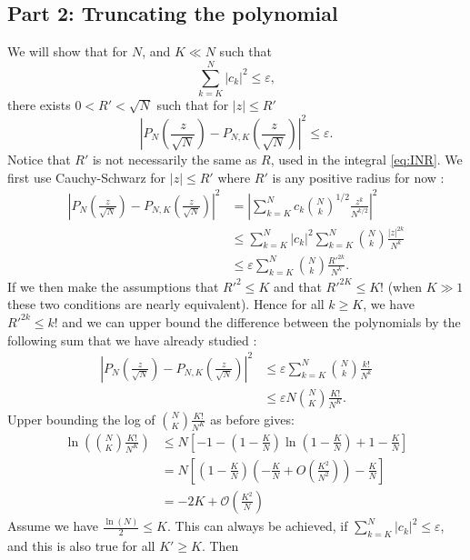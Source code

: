 \documentclass[aps,prl,showpacs,twocolumn]{revtex4-2}
\begin{document}
\subsection{Part 2: Truncating the polynomial}
We will show that for $N$, and $K \ll N$ such that
\[ \sum_{k=K}^N |c_k|^2 \leq \varepsilon, \]
there exists $0 < R' < \sqrt{N}$ such that for $|z| \leq R'$
\[ \left| P_N \left( \frac{z}{\sqrt{N}} \right) - P_{N,K} \left( \frac{z}{\sqrt{N}} \right) \right|^2 \leq \varepsilon. \]
Notice that $R'$ is not necessarily the same as $R$, used in the integral \eqref{eq:INR}. We first use Cauchy-Schwarz for $|z| \leq R'$ where $R'$ is any positive radius for now :
\begin{align*}
    \left| P_N \left( \frac{z}{\sqrt{N}} \right) - P_{N,K} \left( \frac{z}{\sqrt{N}} \right) \right|^2
    &= \left| \sum_{k=K}^N c_k \binom{N}{k}^{1/2} \frac{z^k}{N^{k/2}} \right|^2\\
    &\leq \sum_{k=K}^N |c_k|^2 \sum_{k=K}^N \binom{N}{k} \frac{|z|^{2k}}{N^{k}}\\
    &\leq \varepsilon \sum_{k=K}^N \binom{N}{k} \frac{R'^{2k}}{N^{k}}.
\end{align*}
If we then make the assumptions that $R'^2 \leq K$ and that $R'^{2K} \leq K!$ (when $K\gg1$ these two conditions are nearly equivalent). Hence for all $k \geq K$, we have
$R'^{2k} \leq k!$ and we can upper bound the difference between the polynomials by the following sum that we have already studied :
\begin{align*}
    \left| P_N \left( \frac{z}{\sqrt{N}} \right) - P_{N,K} \left( \frac{z}{\sqrt{N}} \right) \right|^2
    &\leq \varepsilon \sum_{k=K}^N \binom{N}{k} \frac{k!}{N^{k}}\\
    &\leq \varepsilon N \binom{N}{K} \frac{K!}{N^K}.
\end{align*}
Upper bounding the log of $\binom{N}{K} \frac{K!}{N^K}$ as before gives:
\begin{align*}
    \ln \left( \binom{N}{K} \frac{K!}{N^K} \right) &\leq N \left[-1 - \left( 1 - \frac{K}{N} \right) \ln \left( 1 - \frac{K}{N} \right) + 1 - \frac{K}{N} \right]\\
    &= N \left[ \left( 1 - \frac{K}{N} \right) \left( - \frac{K}{N} + O\left( \frac{K^2}{N^2} \right) \right) - \frac{K}{N} \right]\\
    &= -2K + {\mathcal O} \left( \frac{K^2}{N} \right)
\end{align*}
Assume we have $\frac{\ln(N)}{2} \leq K$. This can always be achieved, if $\sum_{k=K}^N |c_k|^2 \leq \varepsilon$,
and this is also true for all $K' \geq K$. Then
\end{document}
